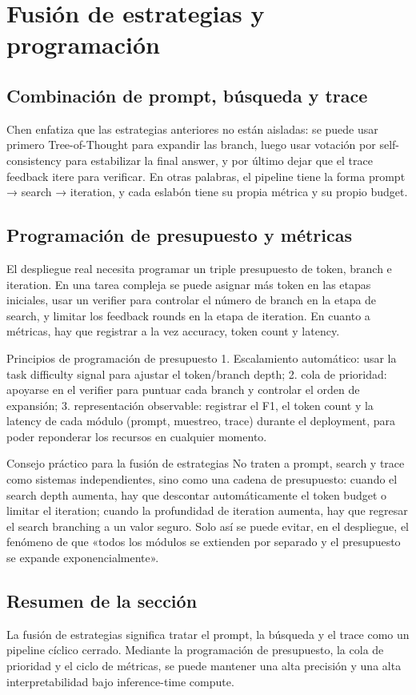 \section{Fusión de estrategias y programación}

\subsection{Combinación de prompt, búsqueda y trace}
Chen enfatiza que las estrategias anteriores no están aisladas: se puede usar primero Tree-of-Thought para expandir las branch, luego usar votación por self-consistency para estabilizar la final answer, y por último dejar que el trace feedback itere para verificar. En otras palabras, el pipeline tiene la forma prompt → search → iteration, y cada eslabón tiene su propia métrica y su propio budget.

\subsection{Programación de presupuesto y métricas}
El despliegue real necesita programar un triple presupuesto de token, branch e iteration. En una tarea compleja se puede asignar más token en las etapas iniciales, usar un verifier para controlar el número de branch en la etapa de search, y limitar los feedback rounds en la etapa de iteration. En cuanto a métricas, hay que registrar a la vez accuracy, token count y latency.

\begin{knowledgebox}{Principios de programación de presupuesto}
1. Escalamiento automático: usar la task difficulty signal para ajustar el token/branch depth; 2. cola de prioridad: apoyarse en el verifier para puntuar cada branch y controlar el orden de expansión; 3. representación observable: registrar el F1, el token count y la latency de cada módulo (prompt, muestreo, trace) durante el deployment, para poder reponderar los recursos en cualquier momento.
\end{knowledgebox}

\begin{importantbox}{Consejo práctico para la fusión de estrategias}
No traten a prompt, search y trace como sistemas independientes, sino como una cadena de presupuesto: cuando el search depth aumenta, hay que descontar automáticamente el token budget o limitar el iteration; cuando la profundidad de iteration aumenta, hay que regresar el search branching a un valor seguro. Solo así se puede evitar, en el despliegue, el fenómeno de que «todos los módulos se extienden por separado y el presupuesto se expande exponencialmente».
\end{importantbox}

\subsection{Resumen de la sección}
La fusión de estrategias significa tratar el prompt, la búsqueda y el trace como un pipeline cíclico cerrado. Mediante la programación de presupuesto, la cola de prioridad y el ciclo de métricas, se puede mantener una alta precisión y una alta interpretabilidad bajo inference-time compute.
